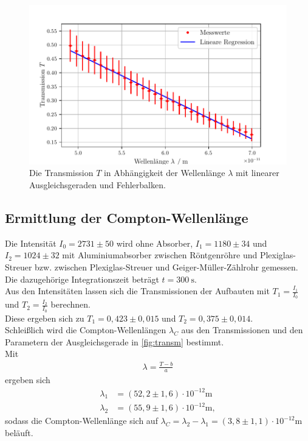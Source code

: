 \begin{figure}[H]
  \centering
  \includegraphics{build/transmission2.pdf}
  \caption{Die Transmission $T$ in Abhängigkeit der Wellenlänge $\lambda$ mit linearer Ausgleichsgeraden und Fehlerbalken.}
  \label{fig:transm2}
\end{figure}



\subsection{Ermittlung der Compton-Wellenlänge}
\label{subsec:comptonwellenl}

Die Intensität $I_0 = 2731 \pm 50$ wird ohne Absorber, $I_1 = 1180 \pm 34$ und $I_2 = 1024 \pm 32$ mit Aluminiumabsorber zwischen Röntgenröhre
und Plexiglas-Streuer bzw. zwischen Plexiglas-Streuer und Geiger-Müller-Zählrohr gemessen.\\
Die dazugehörige Integrationszeit beträgt $t = \SI{300}{\second}$.\\

\noindent Aus den Intensitäten lassen sich die Transmissionen der Aufbauten mit $T_1 = \frac{I_1}{I_0}$ und $T_2 = \frac{I_2}{I_0}$ berechnen. \\
Diese ergeben sich zu $T_1 = 0,423 \pm 0,015$ und $T_2 = 0,375 \pm 0,014$.\\

\noindent Schleißlich wird die Compton-Wellenlängen $\lambda_C$ aus den Transmissionen und den Parametern der Ausgleichsgerade 
in \autoref{fig:transm} bestimmt. \\
Mit 
\begin{align*}
  \lambda = \frac{T-b}{a}
\end{align*}
ergeben sich
\begin{align*}
  \lambda_1 &= (52,2 \pm 1,6) \cdot 10^{-12}\unit{\meter} \\
  \lambda_2 &= (55,9 \pm 1,6) \cdot 10^{-12}\unit{\meter},
\end{align*}
sodass die Compton-Wellenlänge sich auf $\lambda_C = \lambda_2 - \lambda_1 = (3,8 \pm 1,1) \cdot 10^{-12}\unit{\meter}$ beläuft.\\